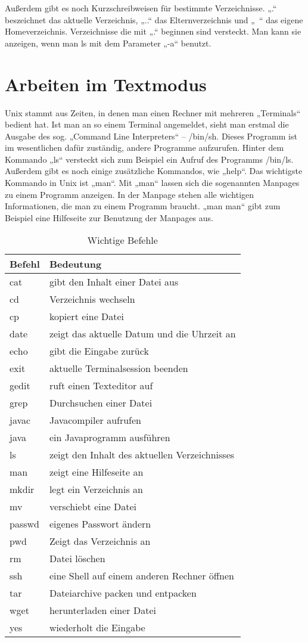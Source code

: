 Außerdem gibt es noch Kurzschreibweisen für bestimmte Verzeichnisse. „.“ beszeichnet das aktuelle Verzeichnis, „..“ das Elternverzeichnis und „~“ das eigene Homeverzeichnis.
Verzeichnisse die mit „.“ beginnen sind versteckt. Man kann sie anzeigen, wenn man ls mit dem Parameter „-a“ benutzt.

\section{Arbeiten im Textmodus}
Unix stammt aus Zeiten, in denen man einen Rechner mit mehreren „Terminals“ bedient hat. Ist man an so einem Terminal angemeldet, sieht man erstmal die Ausgabe des sog. „Command Line Interpreters“ – /bin/sh. Dieses Programm ist im wesentlichen dafür zuständig, andere Programme aufzurufen. Hinter dem Kommando „ls“ versteckt sich zum Beispiel ein Aufruf des Programms /bin/ls. Außerdem gibt es noch einige zusätzliche Kommandos, wie „help“. Das wichtigste Kommando in Unix ist „man“. Mit „man“ lassen sich die sogenannten Manpages zu einem Programm anzeigen. In der Manpage stehen alle wichtigen Informationen, die man zu einem Programm braucht.
„man man“ gibt zum Beispiel eine Hilfeseite zur Benutzung der Manpages aus.

\begin{table}
\centering
\begin{tabular}{l|l}
Befehl & Bedeutung \\ \hline
cat & gibt den Inhalt einer Datei aus \\
cd & Verzeichnis wechseln \\
cp & kopiert eine Datei \\
date & zeigt das aktuelle Datum und die Uhrzeit an \\
echo & gibt die Eingabe zurück \\
exit & aktuelle Terminalsession beenden \\
gedit & ruft einen Texteditor auf \\
grep & Durchsuchen einer Datei \\
javac & Javacompiler aufrufen \\
java & ein Javaprogramm ausführen \\
ls & zeigt den Inhalt des aktuellen Verzeichnisses \\
man & zeigt eine Hilfeseite an \\
mkdir & legt ein Verzeichnis an \\
mv & verschiebt eine Datei \\
passwd & eigenes Passwort ändern \\
pwd & Zeigt das Verzeichnis an \\
rm & Datei löschen \\
ssh & eine Shell auf einem anderen Rechner öffnen \\
tar & Dateiarchive packen und entpacken \\
wget & herunterladen einer Datei \\
yes & wiederholt die Eingabe
\end{tabular}
\label{Befehle}
\caption{Wichtige Befehle}
\end{table}

